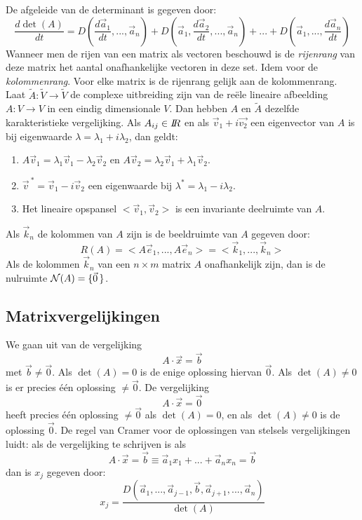 De afgeleide van de determinant is gegeven door:
\[
\frac{d\det(A)}{dt}=D(\frac{d\vec{a}_1}{dt},...,\vec{a}_n)+
D(\vec{a}_1,\frac{d\vec{a}_2}{dt},...,\vec{a}_n)+...+D(\vec{a}_1,...,\frac{d\vec{a}_n}{dt})
\]
Wanneer men de rijen van een matrix als vectoren beschouwd is de {\it rijenrang}
van deze matrix het aantal onafhankelijke vectoren in deze set. Idem voor de
{\it kolommenrang}. Voor elke matrix is de rijenrang gelijk aan de kolommenrang.
\npar
Laat $\tilde{A}:\tilde{V}\rightarrow\tilde{V}$ de complexe uitbreiding zijn van
de re\"ele lineaire afbeelding $A:V\rightarrow V$ in een eindig dimensionale
$V$. Dan hebben $A$ en $\tilde{A}$ dezelfde karakteristieke vergelijking.
\npar
Als $A_{ij}\in I\hspace{-1mm}R$ en als $\vec{v}_1+i\vec{v_2}$ een eigenvector van $A$ is
bij eigenwaarde $\lambda=\lambda_1+i\lambda_2$, dan geldt:
\begin{enumerate}
\item $A\vec{v}_1=\lambda_1\vec{v}_1-\lambda_2\vec{v}_2$ en $A\vec{v}_2=\lambda_2\vec{v}_1+\lambda_1\vec{v}_2$.
\item $\vec{v}^{~*}=\vec{v}_1-i\vec{v}_2$ een eigenwaarde bij $\lambda^*=\lambda_1-i\lambda_2$.
\item Het lineaire opspansel $<\vec{v}_1,\vec{v}_2>$ is een invariante deelruimte van $A$.
\end{enumerate}
Als $\vec{k}_n$ de kolommen van $A$ zijn is de beeldruimte van $A$ gegeven door:
\[
R(A)=<A\vec{e}_1,...,A\vec{e}_n>=<\vec{k}_1,...,\vec{k}_n>
\]
Als de kolommen $\vec{k}_n$ van een $n\times m$ matrix $A$ onafhankelijk zijn,
dan is de nulruimte ${\cal N}(A)=\{\vec{0}\,\}$.

\subsection{Matrixvergelijkingen}
We gaan uit van de vergelijking
\[
A\cdot\vec{x}=\vec{b}
\]
met $\vec{b}\neq\vec{0}$. Als $\det(A)=0$ is de enige oplossing hiervan
$\vec{0}$. Als $\det(A)\neq0$ is er precies \'e\'en oplossing $\neq\vec{0}$.
\npar
De vergelijking
\[
A\cdot\vec{x}=\vec{0}
\]
heeft precies \'e\'en oplossing $\neq\vec{0}$ als $\det(A)=0$, en als
$\det(A)\neq0$ is de oplossing $\vec{0}$.
\npar
De regel van Cramer voor de oplossingen van stelsels vergelijkingen luidt:
als de vergelijking te schrijven is als
\[
A\cdot\vec{x}=\vec{b}\equiv \vec{a}_1x_1+...+\vec{a}_nx_n=\vec{b}
\]
dan is $x_j$ gegeven door:
\[
x_j=\frac{D(\vec{a}_1,...,\vec{a}_{j-1},\vec{b},\vec{a}_{j+1},...,\vec{a}_n)}{\det(A)}
\]

